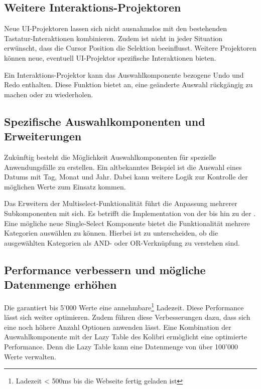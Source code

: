 \subsection{Weitere Interaktions-Projektoren}
\label{sec:moreInteraction}

Neue UI-Projektoren lassen sich nicht ausnahmslos mit den bestehenden Tastatur-Inter\-aktionen kombinieren. 
Zudem ist nicht in jeder Situation erwünscht, dass die Cursor Position die Selektion beeinflusst.
Weitere Projektoren können neue, eventuell UI-Projektor spezifische Interaktionen bieten.

Ein Interaktions-Projektor kann das Auswahlkomponente bezogene Undo und Redo enthalten.
Diese Funktion bietet an, eine geänderte Auswahl rückgängig zu machen oder zu wiederholen.


\subsection{Spezifische Auswahlkomponenten und Erweiterungen}
\label{sec:specificComponents}

Zukünftig besteht die Möglichkeit Auswahlkomponenten für spezielle Anwendungsfälle zu erstellen.
Ein altbekanntes Beispiel ist die Auswahl eines Datums mit Tag, Monat und Jahr.
Dabei kann weitere Logik zur Kontrolle der möglichen Werte zum Einsatz kommen.

Das Erweitern der Multiselect-Funktionalität führt die Anpassung mehrerer Subkomponenten mit sich.
Es betrifft die Implementation von der  bis hin zu der .
Eine mögliche neue Single-Select Komponente bietet die Funktionalität mehrere Kategorien auswählen zu können.
Hierbei ist zu unterscheiden, ob die ausgewählten Kategorien als AND- oder OR-Verknüpfung zu verstehen sind.


\subsection{Performance verbessern und mögliche Datenmenge erhöhen}
\label{sec:betterPerformance}

Die  garantiert bis 5'000 Werte eine annehmbare\footnote{
    Ladezeit < 500ms bis die Webseite fertig geladen ist
} Ladezeit.
Diese Performance lässt sich weiter optimieren.
Zudem führen diese Verbesserungen dazu, dass sich eine noch höhere Anzahl Optionen anwenden lässt.
Eine Kombination der Auswahlkomponente mit der Lazy Table des Kolibri ermöglicht eine optimierte Performance.
Denn die Lazy Table kann eine Datenmenge von über 100'000 Werte verwalten.


